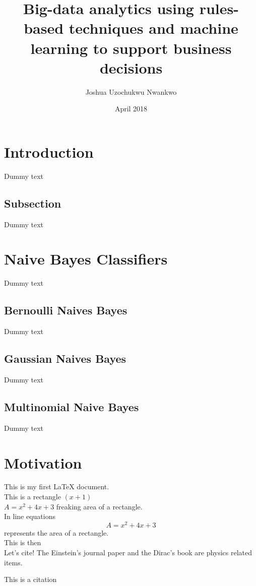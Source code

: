 \documentclass[12pt, letterpaper, titlepage]{report}
\title{\textbf{Big-data analytics using rules-based techniques and machine learning to support business decisions}}
\author{Joshua Uzochukwu Nwankwo}
\date{April 2018}
\begin{document}
\maketitle
\newpage

\tableofcontents
\newpage

\section{\textbf{Introduction}}
Dummy text

\subsection{Subsection}

Dummy text


\section{\textbf{Naive Bayes Classifiers}}
Dummy text

\subsection{Bernoulli Naives Bayes}

Dummy text

\subsection{Gaussian Naives Bayes}

Dummy text

\subsection{Multinomial Naive Bayes}

Dummy text

\newpage
\section{\textbf{Motivation}}
This is my first LaTeX document.\\
This is a rectangle $(x+1)$\\
$A=x^2+4x+3$ freaking area of a rectangle.\\
In line equations $$A=x^2+4x+3$$ represents the area  of a rectangle.\\
This is then\\

Let's cite! The Einstein's journal paper \cite{einstein} and the Dirac's 
book \cite{dirac} are physics related items. 

This is a citation \cite{adams1995hitchhiker}



\end{document}
